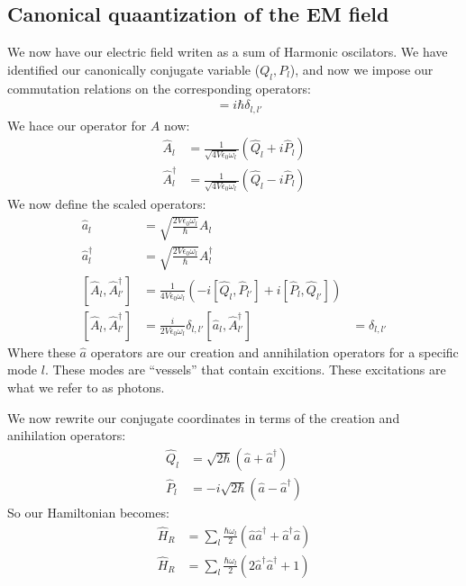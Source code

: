 \subsection{Canonical quaantization of the EM field}
We now have our electric field writen as a sum of Harmonic oscilators. We have identified our canonically conjugate variable ($Q_l,P_l$), and now we impose our commutation relations on the corresponding operators:
\begin{align*}
	[\hat{Q}_l,\hat{P}_{l'}] &= i\hbar\delta_{l,l'}
\end{align*}
We hace our operator for $A$ now:
\begin{align*}
	\hat{A}_l &= \frac{1}{\sqrt{4 V \epsilon_0\omega_l}} (\hat{Q}_l + i\hat{P}_l) \\
	\hat{A}_l^\dagger &= \frac{1}{\sqrt{4 V \epsilon_0\omega_l}} (\hat{Q}_l - i\hat{P}_l)
\end{align*}
We now define the scaled operators:
\begin{align*}
	\hat{a}_l &= \sqrt{\frac{2V\epsilon_0\omega_l}{\hbar}} A_l \\
	\hat{a}_l^\dagger &= \sqrt{\frac{2V\epsilon_0\omega_l}{\hbar}} A_l^\dagger \\
	[\hat{A}_l,\hat{A}_{l'}^\dagger] &= \frac{1}{4V\epsilon_0\omega_l}\left(-i[\hat{Q}_l,\hat{P}_{l'}] + i[\hat{P}_l,\hat{Q}_{l'}]\right) \\
	[\hat{A}_l,\hat{A}_{l'}^\dagger] &= \frac{i}{2V\epsilon_0\omega_l}\delta_{l,l'}
	[\hat{a}_l,\hat{A}_{l'}^\dagger] &= \delta_{l,l'}
\end{align*}
Where these $\hat{a}$ operators are our creation and annihilation operators for a specific mode $l$. These modes are ``vessels'' that contain excitions. These excitations are what we refer to as photons.

We now rewrite our conjugate coordinates in terms of the creation and anihilation operators:
\begin{align*}
	\hat{Q}_l &= \sqrt{2\hbar} (\hat{a} + \hat{a}^\dagger) \\
	\hat{P}_l &= -i\sqrt{2\hbar} (\hat{a} - \hat{a}^\dagger)
\end{align*}
So our Hamiltonian becomes:
\begin{align*}
	\hat{H}_R &= \sum_l \frac{\hbar\omega_l}{2}(\hat{a}\hat{a}^\dagger + \hat{a}^\dagger\hat{a}) \\
	\hat{H}_R &= \sum_l \frac{\hbar\omega_l}{2}(2\hat{a}^\dagger\hat{a}^\dagger + 1)
\end{align*}

